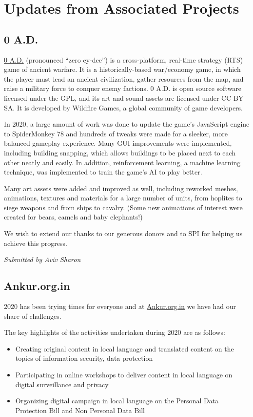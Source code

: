 \documentclass[a4paper]{report}
\begin{document}
\section{Updates from Associated Projects}

\subsection{0 A.D.}

\href{https://play0ad.com/}{0 A.D.} (pronounced ``zero ey-dee'') is a cross-platform, real-time strategy (RTS) game of ancient warfare. It is a historically-based war/economy game, in which the player must lead an ancient civilization, gather resources from the map, and raise a military force to conquer enemy factions. 0 A.D.  is open source software licensed under the GPL, and its art and sound assets are licensed under CC BY-SA. It is developed by Wildfire Games, a global community of game developers.

In 2020, a large amount of work was done to update the game's JavaScript engine to SpiderMonkey 78 and hundreds of tweaks were made for a sleeker, more balanced gameplay experience. Many GUI improvements were implemented, including building snapping, which allows buildings to be placed next to each other neatly and easily. In addition, reinforcement learning, a machine learning technique, was implemented to train the game's AI to play better.

Many art assets were added and improved as well, including reworked meshes, animations, textures and materials for a large number of units, from hoplites to siege weapons and from ships to cavalry. (Some new animations of interest were created for bears, camels and baby elephants!)

We wish to extend our thanks to our generous donors and to SPI for helping us achieve this progress.

{\em Submitted by Aviv Sharon}

\subsection{Ankur.org.in}

2020 has been trying times for everyone and at \href{http://ankur.org.in/}{Ankur.org.in} we have had our share of challenges.

The key highlights of the activities undertaken during 2020 are as follows:

\begin{itemize}

\item Creating original content in local language and translated content on the topics of information security, data protection
\item Participating in online workshops to deliver content in local language on digital surveillance and privacy
\item Organizing digital campaign in local language on the Personal Data Protection Bill and Non Personal Data Bill

\end{itemize}
\end{document}
